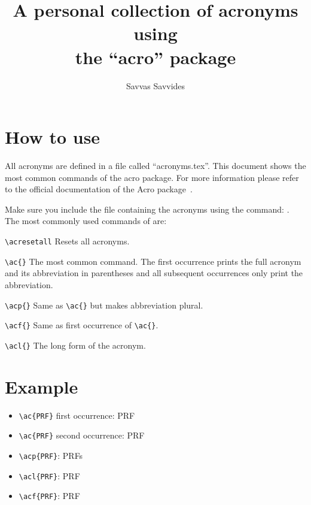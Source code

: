 \documentclass{article}
\begin{document}
\title{A personal collection of acronyms using \\ the ``acro'' package}
\author{Savvas Savvides}
\maketitle

\section{How to use}
All acronyms are defined in a file called ``acronyms.tex''. This document shows the most common commands of the acro package. For more information please refer to the official documentation of the Acro package~\cite{acro}.

Make sure you include the file containing the acronyms using the command: \verb==. The most commonly used commands of are:
\begin{description}
  \item{\verb=\acresetall=}
    Resets all acronyms.
  \item{\verb=\ac{}=}
    The most common command. The first occurrence prints the full acronym and its abbreviation in parentheses and all subsequent occurrences only print the abbreviation.
  \item{\verb=\acp{}=}
    Same as \verb=\ac{}= but makes abbreviation plural.
  \item{\verb=\acf{}=}
    Same as first occurrence of \verb=\ac{}=.
  \item{\verb=\acl{}=}
    The long form of the acronym.
\end{description}


\section{Example}
\begin{itemize}
    \item \verb=\ac{PRF}= first occurrence: \ac{PRF}
    \item \verb=\ac{PRF}= second occurrence: \ac{PRF}
    \item \verb=\acp{PRF}=: \acp{PRF}
    \item \verb=\acl{PRF}=: \acl{PRF}
    \item \verb=\acf{PRF}=: \acf{PRF}
\end{itemize}



\end{document}
